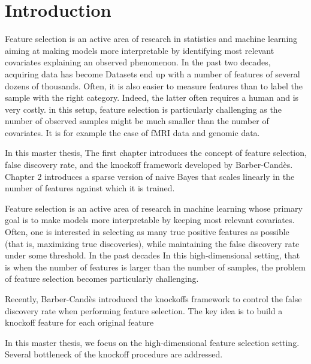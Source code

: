 \cleardoublepage
\chapter*{Introduction}

Feature selection is an active area of research in statistics and machine learning aiming at
making models more interpretable by identifying most relevant covariates explaining an observed phenomenon.
In the past two decades, acquiring data has become
Datasets end up with a number of features of several dozens of thousands.
Often, it is also easier to measure features than to label the sample with the right category.
Indeed, the latter often requires a human and is very costly.
in this setup, feature selection is particularly challenging as the number of observed samples might be much
smaller than the number of covariates.
It is for example the case of fMRI data and genomic data.

In this master thesis,
The first chapter introduces the concept of feature selection,
false discovery rate,
and the knockoff framework developed by Barber-Candès.
Chapter 2 introduces a sparse version of naive Bayes that scales linearly in the number of features against which
it is trained.

Feature selection is an active area of research in machine learning whose primary goal is to make models
more interpretable by keeping most relevant covariates.
Often, one is interested in selecting as many true positive features as possible
(that is, maximizing true discoveries),
while maintaining the false discovery rate under some threshold.
In the past decades
In this high-dimensional setting,
that is when the number of features is larger than the number of samples,
the problem of feature selection becomes particularly challenging.

Recently, Barber-Candès introduced the knockoffs framework to control the false discovery rate
when performing feature selection.
The key idea is to build a knockoff feature for each original feature

In this master thesis, we focus on the high-dimensional feature selection setting.
Several bottleneck of the knockoff procedure are addressed.
